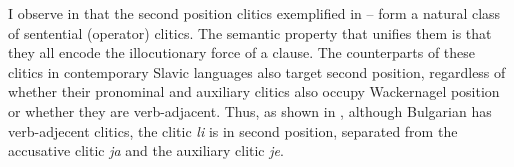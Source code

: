 \documentclass[output=paper,
modfonts,
newtxmath,
hidelinks
]{langscibook}
\begin{document}
\ea \label{11:ex9}
	\label{11:ex9a}
	\label{11:ex9b}
	\label{11:ex9c}
	\z
\z
I observe in \citet{migdalski2016} that the second position clitics exemplified in -- form a natural class of sentential (operator) clitics. The semantic property that unifies them is that they all encode the illocutionary force of a clause. The counterparts of these clitics in contemporary Slavic languages also target second position, regardless of whether their pronominal and auxiliary clitics also occupy Wackernagel position or whether they are verb-adjacent. Thus, as shown in , although Bulgarian has verb-adjecent clitics, the clitic \textit{li} is in second position, separated from the accusative clitic \textit{ja} and the auxiliary clitic \textit{je}.
\end{document}
